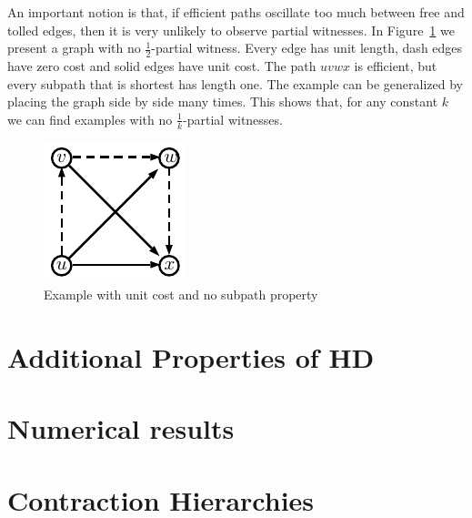 \documentclass[letterpaper,11pt]{article}
\theoremstyle{plain}
\begin{document}
An important notion is that, if efficient paths oscillate too much between free and tolled edges, then it is very unlikely to observe partial witnesses.
In Figure~\ref{fig:nosubpath} we present a graph with no $\frac{1}{2}$-partial witness.
Every edge has unit length, dash edges have zero cost and solid edges have unit cost.
The path $uvwx$ is efficient, but every subpath that is shortest has length one.
The example can be generalized by placing the graph side by side many times.
This shows that, for any constant $k$ we can find examples with no $\frac{1}{k}$-partial witnesses.


\begin{figure}
\caption{Example with unit cost and no subpath property}
\label{fig:nosubpath}
\centering
\includegraphics[scale=1.3]{TexImg/Nosubpath.pdf}
\end{figure}

\section{Additional Properties of  HD}


\section{Numerical results}



\section{Contraction Hierarchies}




\end{document}

